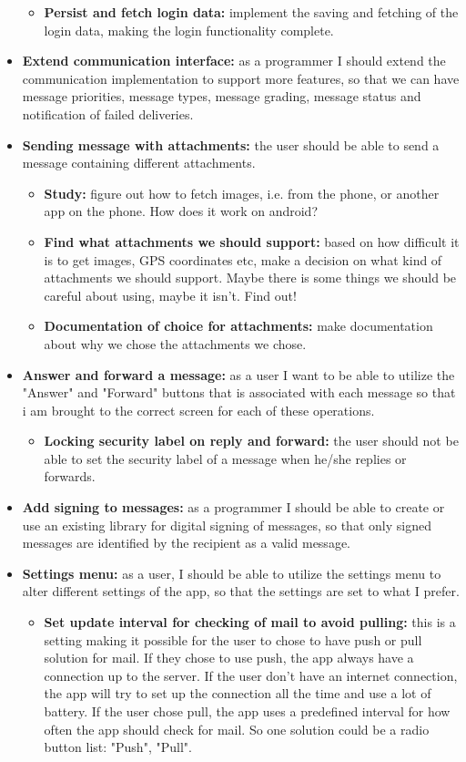 \begin{itemize}
\begin{itemize}
\item{}\textbf{Persist and fetch login data:} implement the saving and fetching of the login data, making the login functionality complete.
\end{itemize}
\item{}\textbf{Extend communication interface:} as a programmer I should extend the communication implementation to support more features, so that we can have message priorities, message types, message grading, message status and notification of failed deliveries.
\item{}\textbf{Sending message with attachments:} the user should be able to send a message containing different attachments.
\begin{itemize}
\item{}\textbf{Study:} figure out how to fetch images, i.e. from the phone, or another app on the phone. How does it work on android?
\item{}\textbf{Find what attachments we should support:} based on how difficult it is to get images, GPS coordinates etc, make a decision on what kind of attachments we should support. Maybe there is some things we should be careful about using, maybe it isn't. Find out!
\item{}\textbf{Documentation of choice for attachments:} make documentation about why we chose the attachments we chose.
\end{itemize}
\item{}\textbf{Answer and forward a message:} as a user I want to be able to utilize the "Answer" and "Forward" buttons that is associated with each message so that i am brought to the correct screen for each of these operations.
\begin{itemize}
\item{}\textbf{Locking security label on reply and forward:} the user should not be able to set the security label of a message when he/she replies or forwards.
\end{itemize}
\item{}\textbf{Add signing to messages:} as a programmer I should be able to create or use an existing library for digital signing of messages, so that only signed messages are identified by the recipient as a valid message.
\item{}\textbf{Settings menu:} as a user, I should be able to utilize the settings menu to alter different settings of the app, so that the settings are set to what I prefer.
\begin{itemize}
\item{}\textbf{Set update interval for checking of mail to avoid pulling:} this is a setting making it possible for the user to chose to have push or pull solution for mail. If they chose to use push, the app always have a connection up to the server. If the user don’t have an internet connection, the app will try to set up the connection all the time and use a lot of battery. If the user chose pull, the app uses a predefined interval for how often the app should check for mail. So one solution could be a radio button list: "Push", "Pull".

\end{itemize}
\end{itemize}
